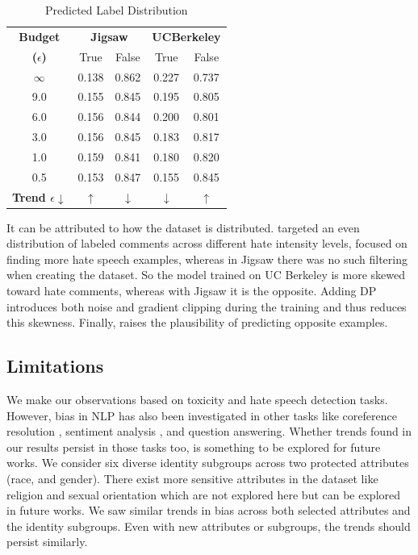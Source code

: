 \documentclass[11pt]{article} %
\begin{document}
\begin{table}[htbp]
\centering
\begin{adjustbox}{max width=0.45\textwidth}
\begin{tabular}{c|cc|cc}
\toprule
\textbf{Budget} & \multicolumn{2}{c}{\textbf{Jigsaw}} & \multicolumn{2}{c}{\textbf{UCBerkeley}} \\
\textbf{($\epsilon$)}  & True & False & True & False \\ \midrule
$\infty$ & 0.138 & 0.862 & 0.227 & 0.737  \\ 
9.0 & 0.155 &0.845 & 0.195 & 0.805 \\ 
6.0 & 0.156 & 0.844 & 0.200 & 0.801 \\ 
3.0 & 0.156 & 0.845 & 0.183 & 0.817 \\ 
1.0 & 0.159 & 0.841 & 0.180  & 0.820 \\ 
0.5 & 0.153 & 0.847 & 0.155 & 0.845 \\ \midrule
\textbf{Trend $\epsilon \downarrow$} &  $\uparrow$ &  $\downarrow$ &  $\downarrow$ &  $\uparrow$ \\
\bottomrule
\end{tabular}
\end{adjustbox}
\caption{Predicted Label Distribution}
\label{table:prediction_distribution}
\end{table}

It can be attributed to how the dataset is distributed. \cite{kennedy2020constructing} targeted an even distribution of labeled comments across different hate intensity levels, focused on finding more hate speech examples, whereas in Jigsaw there was no such filtering when creating the dataset. So the model trained on UC Berkeley is more skewed toward hate comments, whereas with Jigsaw it is the opposite. Adding DP introduces both noise and gradient clipping during the training and thus reduces this skewness. Finally, raises the plausibility of predicting opposite examples.

\subsection{Limitations \label{sec:limitations}}

We make our observations based on toxicity and hate speech detection tasks. However, bias in NLP has also been investigated in other tasks like coreference resolution \cite{zhao-etal-2019-gender}, sentiment analysis \cite{kiritchenko2018examining}, and question answering. Whether trends found in our results persist in those tasks too, is something to be explored for future works. We consider six diverse identity subgroups across two protected attributes (race, and gender). There exist more sensitive attributes in the dataset like religion and sexual orientation which are not explored here but can be explored in future works. We saw similar trends in bias across both selected attributes and the identity subgroups. Even with new attributes or subgroups, the trends should persist similarly. 
\end{document}
